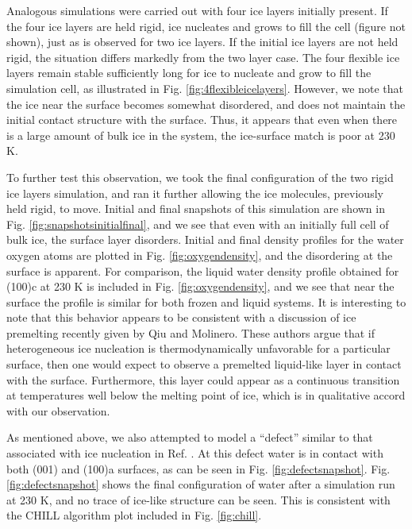 \documentclass[preprint,aps,prb,floatfix]{revtex4-1}
\begin{document}
Analogous simulations were carried out with four ice layers initially present. If the four ice layers are held rigid, ice nucleates and grows to fill the cell (figure not shown), just as is observed for two ice layers. If the initial ice layers are not held rigid, the situation differs markedly from the two layer case. The four flexible ice layers remain stable sufficiently long for ice to nucleate and grow to fill the simulation cell, as  illustrated in Fig. \ref{fig:4flexibleicelayers}. However, we note that the ice near the surface becomes somewhat disordered, and does not maintain the initial contact structure with the surface. Thus, it appears that even when there is a large amount of bulk ice in the system, the ice-surface match is poor at 230 K. 

To further test this observation, we took the final configuration of the two rigid ice layers simulation, and ran it further  allowing the ice molecules, previously held rigid, to move. Initial and final snapshots of this simulation are shown in Fig. \ref{fig:snapshotsinitialfinal}, and we see that even with an initially full cell of bulk ice, the surface layer disorders. Initial and final density profiles for the water oxygen atoms are plotted in Fig. \ref{fig:oxygendensity}, and the disordering at the surface is apparent. For comparison, the liquid water density profile obtained for (100)c at 230 K is included in Fig. \ref{fig:oxygendensity}, and we see that near the surface the profile is similar for both frozen and liquid systems. It is interesting to note that this behavior appears to be consistent with a discussion of ice premelting recently given by Qiu and Molinero.\cite{QM18} These authors argue that if heterogeneous ice nucleation is thermodynamically unfavorable for a particular surface, then one would expect to observe a premelted liquid-like layer in contact with the surface. Furthermore, this layer could appear as a continuous transition at temperatures well below the melting point of ice, which is in qualitative accord with our observation. 

As mentioned above, we also attempted to model a ``defect'' similar to that associated with ice nucleation in Ref. . At this defect water is in contact with both (001) and (100)a surfaces, as can be seen in Fig. \ref{fig:defectsnapshot}. Fig. \ref{fig:defectsnapshot} shows the final configuration of water after a simulation run at 230 K, and no trace of ice-like structure can be seen. This is consistent with the CHILL algorithm plot included in Fig. \ref{fig:chill}. 
 
\end{document}
